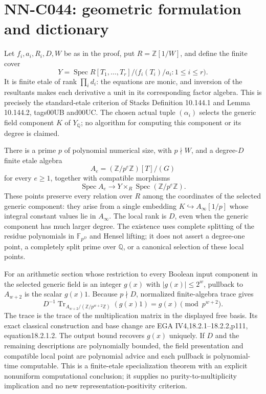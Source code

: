 \section{NN-C044: geometric formulation and dictionary}
\begin{geometricstatement}[NN-C044]
Let $f_i,a_i,R_i,D,W$ be as in the proof, put $R=\mathbb Z[1/W]$, and define the finite cover
\[
 Y=\operatorname{Spec}
       R[T_1,\ldots,T_r]/\bigl(f_i(T_i)/a_i:1\le i\le r\bigr).
\]
It is finite etale of rank $\prod_i d_i$: the equations are monic, and inversion of the resultants makes each derivative a unit in its corresponding factor algebra. This is precisely the standard-etale criterion of Stacks Definition 10.144.1 and Lemma 10.144.2, tags00UB and00UC. The chosen actual tuple $(\alpha_i)$ selects the generic field component $K$ of $Y_{\mathbb Q}$; no algorithm for computing this component or its degree is claimed.

There is a prime $p$ of polynomial numerical size, with $p\nmid W$, and a degree-$D$ finite etale algebra
\[
       A_e=(\mathbb Z/p^e\mathbb Z)[T]/(G)
\]
for every $e\ge1$, together with compatible morphisms
\[
       \operatorname{Spec}A_e\longrightarrow
           Y\times_R\operatorname{Spec}(\mathbb Z/p^e\mathbb Z).
\]
These points preserve every relation over $R$ among the coordinates of the selected generic component: they arise from a single embedding $K\hookrightarrow A_\infty[1/p]$ whose integral constant values lie in $A_\infty$. The local rank is $D$, even when the generic component has much larger degree. The existence uses complete splitting of the residue polynomials in $\mathbb F_{p^D}$ and Hensel lifting; it does not assert a degree-one point, a completely split prime over $\mathbb Q$, or a canonical selection of these local points.

For an arithmetic section whose restriction to every Boolean input component in the selected generic field is an integer $g(x)$ with $|g(x)|\le2^w$, pullback to $A_{w+2}$ is the scalar $g(x)1$. Because $p\nmid D$, normalized finite-algebra trace gives
\[
 D^{-1}\operatorname{Tr}_{A_{w+2}/(\mathbb Z/p^{w+2}\mathbb Z)}(g(x)1)
                  =g(x)\pmod{p^{w+2}}.
\]
The trace is the trace of the multiplication matrix in the displayed free basis. Its exact classical construction and base change are EGA IV4,18.2.1--18.2.2,p111, equation18.2.1.2. The output bound recovers $g(x)$ uniquely. If $D$ and the remaining descriptions are polynomially bounded, the field presentation and compatible local point are polynomial advice and each pullback is polynomial-time computable. This is a finite-etale specialization theorem with an explicit nonuniform computational conclusion; it supplies no purity-to-multiplicity implication and no new representation-positivity criterion.


\end{geometricstatement}
